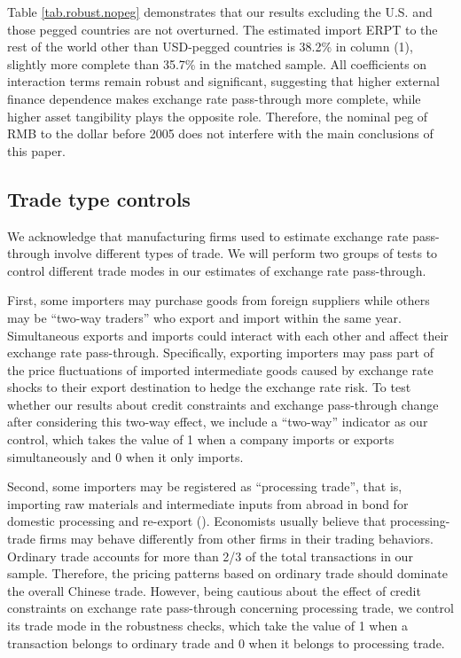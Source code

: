 Table \ref{tab.robust.nopeg} demonstrates that our results excluding the U.S. and those pegged countries are not overturned. The estimated import ERPT to the rest of the world other than USD-pegged countries is 38.2\% in column (1), slightly more complete than 35.7\% in the matched sample. All coefficients on interaction terms remain robust and significant, suggesting that higher external finance dependence makes exchange rate pass-through more complete, while higher asset tangibility plays the opposite role. Therefore, the nominal peg of RMB to the dollar before 2005 does not interfere with the main conclusions of this paper.

\subsection{Trade type controls}

We acknowledge that manufacturing firms used to estimate exchange rate pass-through involve different types of trade. We will perform two groups of tests to control different trade modes in our estimates of exchange rate pass-through.

First, some importers may purchase goods from foreign suppliers while others may be ``two-way traders'' who export and import within the same year. Simultaneous exports and imports could interact with each other and affect their exchange rate pass-through. Specifically, exporting importers may pass part of the price fluctuations of imported intermediate goods caused by exchange rate shocks to their export destination to hedge the exchange rate risk. To test whether our results about credit constraints and exchange pass-through change after considering this two-way effect, we include a ``two-way'' indicator as our control, which takes the value of 1 when a company imports or exports simultaneously and 0 when it only imports.

Second, some importers may be registered as ``processing trade'', that is, importing raw materials and intermediate inputs from abroad in bond for domestic processing and re-export (\cite{manova-yu2016}). Economists usually believe that processing-trade firms may behave differently from other firms in their trading behaviors. Ordinary trade accounts for more than 2/3 of the total transactions in our sample. Therefore, the pricing patterns based on ordinary trade should dominate the overall Chinese trade. However, being cautious about the effect of credit constraints on exchange rate pass-through concerning processing trade, we control its trade mode in the robustness checks, which take the value of 1 when a transaction belongs to ordinary trade and 0 when it belongs to processing trade.

